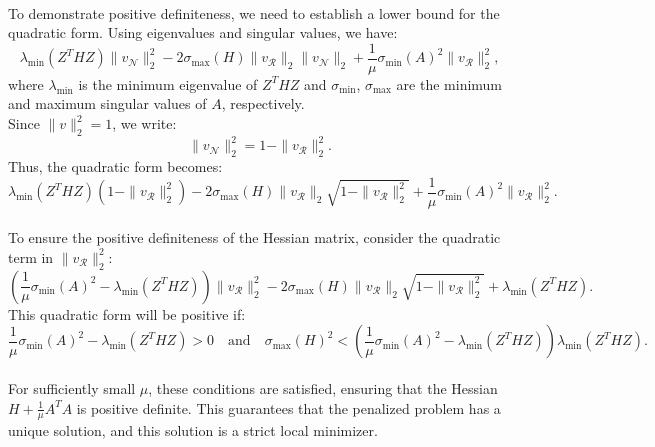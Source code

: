 \documentclass[11pt,onecolumn]{article}
\begin{document}
\\
To demonstrate positive definiteness, we need to establish a lower bound for the quadratic form. Using eigenvalues and singular values, we have:
\[
\lambda_{\min}(Z^T H Z) \|v_\mathcal{N}\|_2^2 - 2 \sigma_{\max}(H) \|v_\mathcal{R}\|_2 \|v_\mathcal{N}\|_2 + \frac{1}{\mu} \sigma_{\min}(A)^2 \|v_\mathcal{R}\|_2^2,
\]
where \(\lambda_{\min}\) is the minimum eigenvalue of \(Z^T H Z\) and \(\sigma_{\min}\), \(\sigma_{\max}\) are the minimum and maximum singular values of \(A\), respectively.
\\
Since \(\|v\|_2^2 = 1\), we write:
\[
\|v_\mathcal{N}\|_2^2 = 1 - \|v_\mathcal{R}\|_2^2.
\]
Thus, the quadratic form becomes:
\[
\lambda_{\min}(Z^T H Z) (1 - \|v_\mathcal{R}\|_2^2) - 2 \sigma_{\max}(H) \|v_\mathcal{R}\|_2 \sqrt{1 - \|v_\mathcal{R}\|_2^2} + \frac{1}{\mu} \sigma_{\min}(A)^2 \|v_\mathcal{R}\|_2^2.
\]
\\
To ensure the positive definiteness of the Hessian matrix, consider the quadratic term in \(\|v_\mathcal{R}\|_2^2\):
\[
\left( \frac{1}{\mu} \sigma_{\min}(A)^2 - \lambda_{\min}(Z^T H Z) \right) \|v_\mathcal{R}\|_2^2 - 2 \sigma_{\max}(H) \|v_\mathcal{R}\|_2 \sqrt{1 - \|v_\mathcal{R}\|_2^2} + \lambda_{\min}(Z^T H Z).
\]
This quadratic form will be positive if:
\[
\frac{1}{\mu} \sigma_{\min}(A)^2 - \lambda_{\min}(Z^T H Z) > 0 \quad \text{and} \quad \sigma_{\max}(H)^2 < \left( \frac{1}{\mu} \sigma_{\min}(A)^2 - \lambda_{\min}(Z^T H Z) \right) \lambda_{\min}(Z^T H Z).
\]
\\
For sufficiently small \(\mu\), these conditions are satisfied, ensuring that the Hessian \(H + \frac{1}{\mu} A^T A\) is positive definite. This guarantees that the penalized problem has a unique solution, and this solution is a strict local minimizer.
\end{document}
